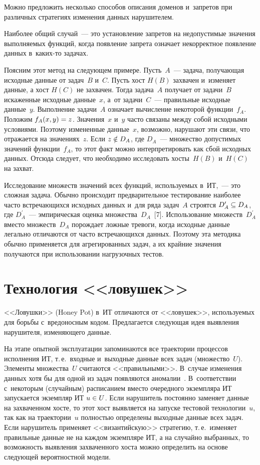 \begin{multicols}{2}
  Можно предложить несколько способов описания доменов и~запретов при 
различных стратегиях изменения данных нарушителем. 
  
  Наиболее общий случай~--- это установление запретов на недопустимые 
значения выполняемых функций, когда появление запрета означает некорректное 
появление данных в~ка\-ких-то задачах. 
  
  Поясним этот метод на следующем примере. Пусть~$A$~--- задача, 
получающая исходные данные от задач~$B$ и~$C$. Пусть хост $H(B)$ захвачен 
и~изменяет данные, а хост $H(C)$ не захвачен. Тогда задача~$A$ получает от 
задачи~$B$ искаженные исходные данные~$x$, а~от задачи~$C$~--- правильные 
исходные данные~$y$. Выполнение задачи~$A$ означает вычисление некоторой 
функции~$f_A$. Положим  $f_A(x,y)\hm=z$. Значения~$x$ и~$y$ часто связаны 
между собой исходными условиями. Поэтому измененные данные~$x$, возможно, 
нарушают эти связи, что отражается на значениях~$z$. Если $z\hm\notin D_A$, где 
$D_A$~--- множество допустимых значений функции~$f_A$, то этот факт можно 
интерпретировать как сбой исходных данных. Отсюда следует, что необходимо 
исследовать хосты~$H(B)$ и~$H(C)$ на захват.
  
  Исследование множеств значений всех функций, используемых в~ИТ,~--- это 
сложная задача. Обычно происходит предварительное тестирование наиболее 
часто встречающихся исходных данных и~для ряда задач~$A$ строятся 
$D_A^\prime \hm\subseteq D_A$, где $D^\prime_A$~--- эмпирическая оценка 
множества~$D_A$~[7]. Использование множеств~$D^\prime_A$ вместо 
множеств~$D_A$ порождает ложные тревоги, когда исходные данные легально 
отличаются от часто встречающихся данных. Поэтому эта методика обычно 
применяется для агрегированных задач, а их крайние значения получаются при 
использовании нагрузочных тестов.

\section{Технология <<ловушек>>}

  <<Ловушки>> (Honey Pot) в~ИТ отличаются от <<ловушек>>, используемых 
для борьбы с~вредоносным кодом. Предлагается следующая идея выявления 
нарушителя, изменяющего данные. 
  
  На этапе опытной эксплуатации запоминаются все траектории процессов 
исполнения ИТ, т.\,е.\ входные и~выходные данные всех задач (множество~$U$). 
Элементы множества~$U$ считаются <<правильными>>. В~случае изменения 
данных хотя бы для одной из задач появляются аномалии~\cite{8-gr}. 
В~соответствии с~некоторым (случайным) расписанием вместо очередного 
экземпляра ИТ запускается экземпляр ИТ $u\hm\in U$. Если нарушитель 
постоянно заменяет данные на захваченном хосте, то этот хост выявляется на 
запуске тестовой технологии~$u$, так как на траектории~$u$ полностью 
определены выходные данные всех задач. Если нарушитель применяет 
<<византийскую>> стратегию, т.\,е.\ изменяет правильные данные не на каждом 
экземпляре ИТ, а на случайно выбранных, то возможность выявления 
захваченного хоста можно определить на основе следующей вероятностной 
модели.  
  

\end{multicols}
